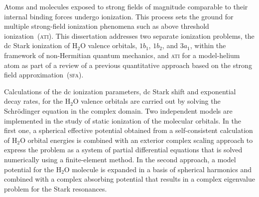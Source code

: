 





Atoms and molecules exposed to strong fields of magnitude comparable
to their internal binding forces undergo ionization. This process sets
the ground for multiple strong-field ionization phenomena such as
above threshold ionization~(\textsc{ati}).
This dissertation addresses two separate ionization problems, the dc
Stark ionization of H$_{2}$O valence orbitals, $1b_{1}$, $1b_{2}$, and
$3a_{1}$, within the framework of non-Hermitian quantum mechanics, and
\textsc{ati} for a model-helium atom as part of a review of a previous
quantitative approach based on the strong field
approximation~(\textsc{sfa}).


Calculations of the dc ionization parameters, dc Stark shift and
exponential decay rates, for the H$_{2}$O valence orbitals are carried
out by solving the Schr\"{o}dinger equation in the complex domain. Two
independent models are implemented in the study of static ionization
of the molecular orbitals. In the first one, a spherical effective
potential obtained from a self-consistent calculation of H$_{2}$O
orbital energies is combined with an exterior complex scaling approach
to express the problem as a system of partial differential equations
that is solved numerically using a finite-element method. In the
second approach, a model potential for the H$_{2}$O molecule is
expanded in a basis of spherical harmonics and combined with a complex
absorbing potential that results in a complex eigenvalue problem for
the Stark resonances.

